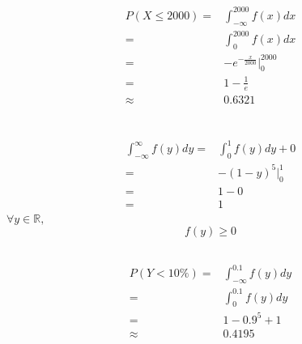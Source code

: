 \documentclass{article}
\begin{document}
        \subsection{}
            \begin{equation*}
                \begin{split}
                    P(X\leq 2000)=&\int_{-\infty}^{2000} f(x)dx\\
                        =&\int_{0}^{2000} f(x)dx\\
                        =&-e^{-\frac{x}{2000}}|_0^{2000}\\
                        =&1-\frac{1}{e}\\
                        \approx&0.6321
                \end{split}
            \end{equation*}
    \section{}
        \subsection{}
            \begin{equation*}
                \begin{split}
                    \int_{-\infty}^{\infty} f(y)dy =& \int_{0}^1 f(y)dy+0\\
                        =&-(1-y)^5|_0^1\\
                        =&1-0\\
                        =&1
                \end{split}
            \end{equation*}
            $\forall y \in \mathbb{R},$
                $$f(y)\geq0$$
        \subsection{}
            \begin{equation*}
                \begin{split}
                    P(Y<10\%)=&\int_{-\infty}^{0.1}f(y)dy\\
                        =&\int_0^{0.1}f(y)dy\\
                        =&1-0.9^5+1\\
                        \approx&0.4195
                \end{split}
            \end{equation*}
\end{document}
